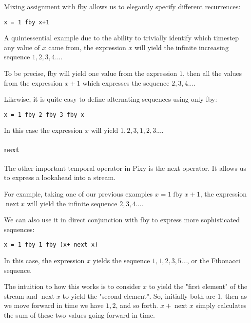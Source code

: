 \documentclass{scrartcl}
\DeclareMathOperator{\fby}{fby}
\DeclareMathOperator{\nextop}{next}
\begin{document}
    Mixing assignment with fby allows us to elegantly specify different recurrences:
    
    \begin{lstlisting}
x = 1 fby x+1
    \end{lstlisting}
    
    A quintessential example due to the ability to trivially identify which timestep any value of $x$ came from, the expression $x$ will yield the infinite increasing sequence $1,2,3,4 ...$.
    
    To be precise, fby will yield one value from the expression $1$, then all the values from the expression $x+1$ which expresses the sequence $2,3,4 ...$.
    
    Likewise, it is quite easy to define alternating sequences using only fby:
    
    \begin{lstlisting}
x = 1 fby 2 fby 3 fby x
    \end{lstlisting}
    
    In this case the expression $x$ will yield $1, 2, 3, 1, 2, 3 ...$.
    
    \paragraph{next}
    
    The other important temporal operator in Pixy is the next operator. It allows us to express a lookahead into a stream.
    
    For example, taking one of our previous examples $x = 1 \fby x+1$, the expression $\nextop x$ will yield the infinite sequence $2,3,4 ...$.
    
    We can also use it in direct conjunction with fby to express more sophisticated sequences:
    
    \begin{lstlisting}
x = 1 fby 1 fby (x+ next x)
    \end{lstlisting}
    
    In this case, the expression $x$ yields the sequence $1, 1, 2, 3, 5 ...$, or the Fibonacci sequence.
    
    The intuition to how this works is to consider $x$ to yield the "first element" of the stream and $\nextop x$ to yield the "second element". So, initially both are $1$, then as we move forward in time we have $1, 2$, and so forth. $x + \nextop x$ simply calculates the sum of these two values going forward in time.
    
\end{document}
